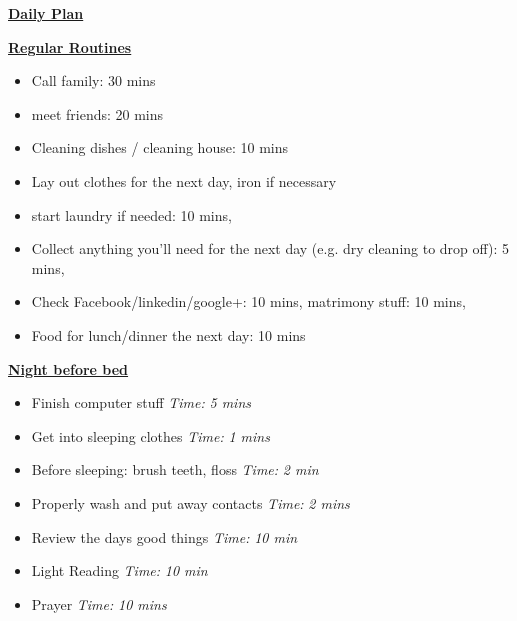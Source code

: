 \documentclass[serif,mathserif,final]{beamer}
\newcommand{\timeEst}[1]{\textit{Time:} \textit{#1}}
\begin{document}
\begin{frame}{}
\begin{columns}[t]
\begin{column}{0.33\linewidth}{\textbf{\underline{Daily Plan}}}
\begin{block}{\small \textbf{\underline{Regular Routines}} }
\begin{itemize}
\item \tiny Call family: 30 mins
\item \tiny meet friends: 20 mins
\item \tiny Cleaning dishes / cleaning house: 10 mins
\item \tiny Lay out clothes for the next day, iron if necessary
\item \tiny start laundry if needed: 10 mins,
\item \tiny Collect anything you’ll need for the next day (e.g. dry cleaning to drop off): 5 mins,
\item \tiny Check Facebook/linkedin/google+: 10 mins, matrimony stuff: 10 mins,
\item \tiny Food for lunch/dinner the next day: 10 mins
\end{itemize}

\underline{\textbf{Night before bed}}
\begin{itemize}
\item \tiny Finish computer stuff \timeEst{5 mins}
\item \tiny Get into sleeping clothes \timeEst{1 mins}
\item \tiny Before sleeping: brush teeth, floss \timeEst{ 2 min}
\item \tiny Properly wash and put away contacts \timeEst{ 2 mins}
\item \tiny Review the days good things \timeEst{ 10 min}
\item \tiny Light Reading \timeEst{ 10 min}
\item \tiny Prayer \timeEst{10 mins}
\end{itemize}
\end{block}

\end{column}%

\end{columns} 

\end{frame} 
\end{document}
